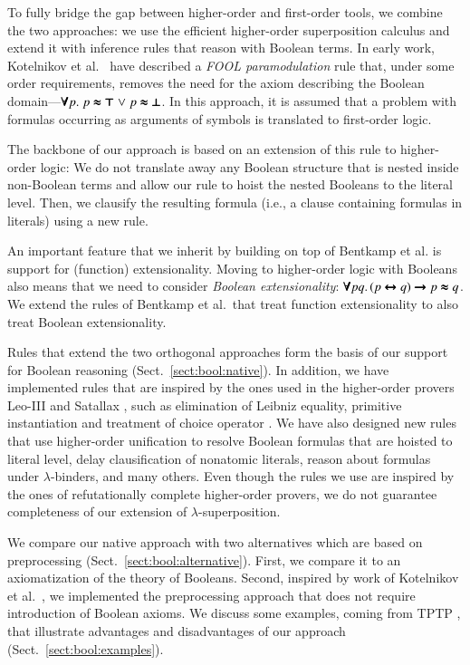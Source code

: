  To fully bridge the gap between higher-order and first-order tools,
we combine the two approaches: we use the efficient higher-order superposition
calculus and extend it with inference rules that reason with
Boolean terms. In early work, Kotelnikov et al.\ 
\cite{kotelnikov-15-fool} have described a \emph{FOOL paramodulation}
rule that, under some order requirements, removes the need for the axiom
describing the Boolean domain---$\pmb{\forall} p. \; p \pmb{\approx} \pmb{\top} \mathrel\lor p
\pmb{\approx} \pmb{\bot}$. In this approach, it is assumed that a problem with formulas occurring as
arguments of symbols is translated to first-order logic. 

The backbone of our approach is based on an extension of this rule to higher-order
logic: We do not translate away any Boolean structure that is nested inside
non-Boolean terms and allow our rule to hoist the nested Booleans to the
literal level. Then, we clausify the resulting formula (i.e., a clause containing formulas in literals) using a new rule.


 An important feature that we inherit by building on top of Bentkamp
et al. \cite{bbtvw-21-sup-lam} is support for (function) extensionality. Moving to higher-order
logic with Booleans also means that we need to consider \emph{Boolean extensionality}: $\pmb{\forall} pq. \, (p
\pmb{\leftrightarrow} q) \pmb{\rightarrow} p \pmb{\approx} q$. We extend the rules of Bentkamp et al.\ 
that treat function extensionality to also treat Boolean extensionality.

\looseness=-1
Rules that extend the two orthogonal approaches form the basis of our support
for Boolean reasoning (Sect.~\ref{sect:bool:native}). In addition, we have
implemented rules that are inspired by the ones used in the
higher-order provers Leo-III \cite{sb-21-leo3} and Satallax
\cite{cb-12-satallax}, such as elimination of Leibniz equality, primitive
instantiation and treatment of choice operator \cite{pa-01-classical-ty-thy}. We
have also designed new rules that use higher-order unification to resolve
Boolean formulas that are hoisted to literal level, delay clausification of nonatomic
literals, reason about formulas under $\lambda$-binders, and many others. Even
though the rules we use are inspired by the ones of refutationally complete
higher-order provers, we do not guarantee completeness of our extension of
$\lambda$-superposition.


We compare our native approach with two alternatives which are based on
preprocessing (Sect.~\ref{sect:bool:alternative}). First, we compare it to  an
axiomatization of the theory of Booleans. Second, inspired by work of
Kotelnikov et al.\ \cite{kotelnikov-16-fool}, we implemented the preprocessing approach that does not
require introduction of Boolean axioms.
We discuss some examples, coming from TPTP \cite{gs-17-tptp}, that
illustrate advantages and disadvantages of our approach (Sect.~\ref{sect:bool:examples}).

